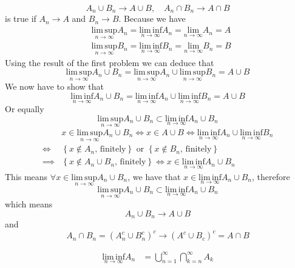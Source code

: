 \begin{list}{1.9.}{}
  \[
    A_n\cup B_n \to A\cup B,\quad A_n\cap B_n \to A \cap B
  \]
  is true if $A_n\to A$ and $B_n \to B$. Because we have
  \[
    \begin{aligned}
      & \underset{n\to\infty}{\mathrm{lim\,sup}} A_n
      = \underset{n\to\infty}{\mathrm{lim\,inf}} A_n
      = \underset{n\to\infty}{\mathrm{lim}} A_n = A    \\
      & \underset{n\to\infty}{\mathrm{lim\,sup}} B_n
      = \underset{n\to\infty}{\mathrm{lim\,inf}} B_n
      = \underset{n\to\infty}{\mathrm{lim}} B_n = B
    \end{aligned}
  \]
  Using the result of the first problem we can deduce that
  \[
    \underset{n\to\infty}{\mathrm{lim\,sup}} A_n\cup B_n =
    \underset{n\to\infty}{\mathrm{lim\,sup}} A_n \cup \underset{n\to\infty}{\mathrm{lim\,sup}} B_n
    = A \cup B
  \]
  We now have to show that
  \[
    \underset{n\to\infty}{\mathrm{lim\,inf}} A_n \cup B_n =
    \underset{n\to\infty}{\mathrm{lim\,inf}} A_n \cup \underset{n\to\infty}{\mathrm{lim\,inf}} B_n
    = A \cup B
  \]
  Or equally
  \[
    \underset{n\to\infty}{\mathrm{lim\,sup}} A_n \cup B_n
    \subset
    \underset{n\to\infty}{\mathrm{lim\,inf}} A_n \cup B_n
  \]
  \[
    \begin{aligned}
      & x \in \underset{n\to\infty}{\mathrm{lim\,sup}} A_n \cup B_n
      \iff x \in A \cup B
      \iff \underset{n\to\infty}{\mathrm{lim\,inf}} A_n \cup \underset{n\to\infty}{\mathrm{lim\,inf}} B_n\\
      \iff&
      \left\{x \notin A_n\text{, finitely}\right\} \text{ or } \left\{x \notin B_n\text{, finitely}\right\}    \\
      \implies& \left\{ x \notin A_n \cup B_n \text{, finitely}\right\}
      \iff x \in \underset{n\to\infty}{\mathrm{lim\,inf}} A_n \cup B_n
    \end{aligned}
  \]
  This means $\forall x\in \underset{n\to\infty}{\mathrm{lim\,sup}} A_n \cup B_n$, we have that $x\in\underset{n\to\infty}{\mathrm{lim\,inf}} A_n \cup B_n$, therefore
  \[
    \underset{n\to\infty}{\mathrm{lim\,sup}} A_n \cup B_n
    \subset
    \underset{n\to\infty}{\mathrm{lim\,inf}} A_n \cup B_n
  \]
  which means
  \[
    A_n \cup B_n \to A \cup B
  \]
  and
  \[
    A_n \cap B_n = \left(A_n^c \cup B_n^c\right)^c \to \left(A^c \cup B_c\right)^c = A \cap B
  \]
\item \label{ex.1.9.4}
  \[
    \begin{aligned}
      \underset{n\to\infty}{\mathrm{lim\,inf}} A_n &= \bigcup\limits_{n=1}^\infty \bigcap\limits_{k=n}^\infty A_k    \\

\end{aligned}\]
\end{list}
